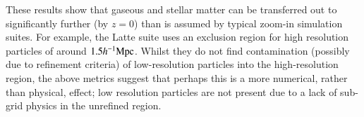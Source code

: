 These results show that gaseous and stellar matter can be transferred out
to significantly further (by $z=0$) than is assumed by typical zoom-in simulation
suites. For example, the Latte \citep{Wetzel2016} suite uses an exclusion region
for high resolution particles of around $1.5 h^{-1}{\rm Mpc}{}$. Whilst they do not find
contamination (possibly due to refinement criteria) of low-resolution particles
into the high-resolution region, the above metrics suggest that perhaps this is
a more numerical, rather than physical, effect; low resolution particles are
not present due to a lack of sub-grid physics in the unrefined region.
